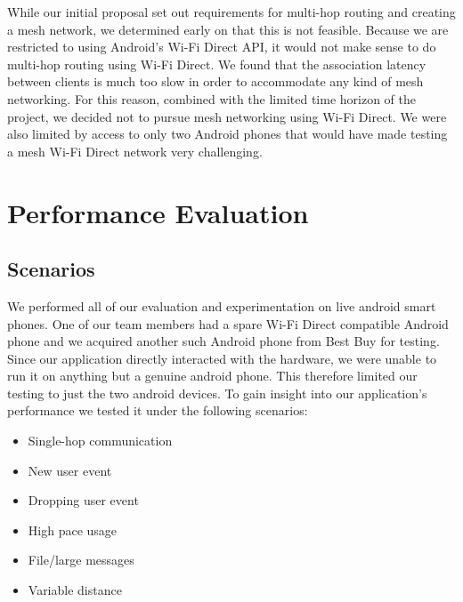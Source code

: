\documentclass[10pt]{article}
\begin{document}
While our initial proposal set out requirements for multi-hop routing and creating a mesh network, we determined early on that this is not feasible. Because we are restricted to using Android's Wi-Fi Direct API, it would not make sense to do multi-hop routing using Wi-Fi Direct. We found that the association latency between clients is much too slow in order to accommodate any kind of mesh networking. For this reason, combined with the limited time horizon of the project, we decided not to pursue mesh networking using Wi-Fi Direct. We were also limited by access to only two Android phones that would have made testing a mesh Wi-Fi Direct network very challenging.

\section{Performance Evaluation}
\subsection{Scenarios}

We performed all of our evaluation and experimentation on live android smart phones. One of our team members had a spare Wi-Fi Direct compatible Android phone and we acquired another such Android phone from Best Buy for testing. Since our application directly interacted with the hardware, we were unable to run it on anything but a genuine android phone. This therefore limited our testing to just the two android devices. To gain insight into our application's performance we tested it under the following scenarios:

\begin{itemize}
    \item Single-hop communication
    \item New user event
    \item Dropping user event
    \item High pace usage
    \item File/large messages
    \item Variable distance
\end{itemize}
\end{document}
